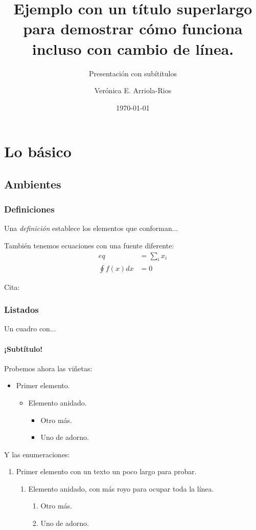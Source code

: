 \documentclass[aspectratio=169,usenames,dvipsnames,svgnames,table]{beamer}
\title{Ejemplo con un título superlargo para demostrar cómo funciona incluso con cambio de línea.}
\subtitle{Presentación con subítitulos}
\author[Ver\'onica E. Arriola-Rios]{Verónica E. Arriola-Rios}
\institute{Facultad de Ciencias, UNAM}
\date{\today}
\begin{document}
\frame{\titlepage}

\section{Lo básico}

\subsection{Ambientes}

\subsubsection{Definiciones}

\begin{frame}
\begin{definition}[Definición]
 Una \emph{definición} establece los elementos que conforman...
\end{definition}

También tenemos ecuaciones con una fuente diferente:
\begin{align}
 eq &= \sum_{i} x_i \\
 \oint f(x) dx &= 0
\end{align}

Cita: \cite{Viso2012}

\end{frame}


\subsubsection{Listados}

\begin{frame}{Un cuadro con...}
\framesubtitle{¡Subtítulo!}
Probemos ahora las viñetas:
\begin{itemize}
 \item Primer elemento.
 \begin{itemize}
  \item Elemento anidado.
  \begin{itemize}
   \item Otro más.
   \item Uno de adorno.
  \end{itemize}
 \end{itemize}
\end{itemize}

Y las enumeraciones:
\begin{enumerate}
 \item Primer elemento con un texto un poco largo para probar.
 \begin{enumerate}
  \item Elemento anidado, con más royo para ocupar toda la línea.
  \begin{enumerate}
   \item Otro más.
   \item Uno de adorno.
  \end{enumerate}
 \end{enumerate}
\end{enumerate}

\end{frame}
\end{document}
